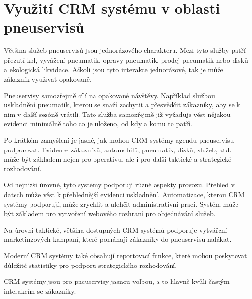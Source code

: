\section{Využití CRM systému v oblasti pneuservisů}
Většina služeb pneuservisů jsou jednorázového charakteru. Mezi tyto služby patří přezutí kol, vyvážení pneumatik, opravy pneumatik, prodej pneumatik nebo disků a ekologická likvidace. Ačkoli jsou tyto interakce jednorázové, tak je může zákazník využívat opakovaně. 

Pneuservisy samozřejmě cílí na opakované návštěvy. Například službou uskladnění pneumatik, kterou se snaží zachytit a přesvědčit zákazníky, aby se k nim v další sezóně vrátili. Tato služba samozřejmě již vyžaduje vést nějakou evidenci minimálně toho co je uloženo, od kdy a komu to patří.

Po krátkém zamyšlení je jasné, jak mohou CRM systémy agendu pneuservisu podporovat. Evidence zákazníků, automobilů, pneumatik, disků, služeb, atd. může být základem nejen pro operativu, ale i pro další taktické a strategické rozhodování.

Od nejnižší úrovně, tyto systémy podporují různé aspekty provozu. Přehled v datech může vést k přehlednější evidenci uskladnění. Automatizace, kterou CRM systémy podporují, může zrychlit a ulehčit administrativní práci. Systém může být základem pro vytvoření webového rozhraní pro objednávání služeb.

Na úrovni taktické, většina dostupných CRM systémů podporuje vytváření marketingových kampaní, které pomáhají zákazníky do pneuservisu nalákat.

Moderní CRM systémy také obsahují reportovací funkce, které mohou poskytovat důležité statistiky pro podporu strategického rozhodování.

CRM systémy jsou pro pneuservisy jasnou volbou, a to hlavně kvůli častým interakcím se zákazníky.

